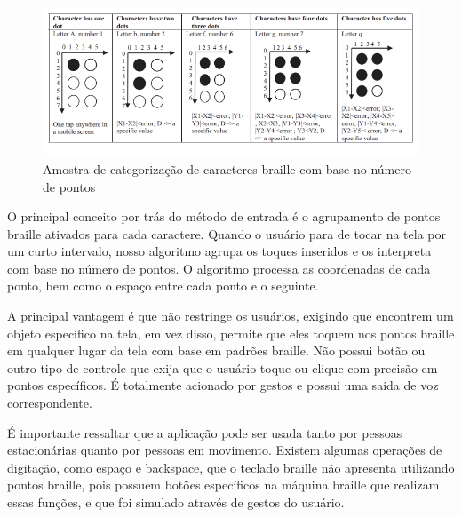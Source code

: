 \begin{figure}[h]
    \centering
    \includegraphics{ch02/assets/categorization-of-braille.png}
    \decoRule
    \caption[Categorização de coordenadas do SingleTapBraille]{Amostra de categorização de caracteres braille com base no número de pontos \parencite{REF07}}
    \label{fig:ch02-categorization-of-braille}
\end{figure}

O principal conceito por trás do método de entrada é o agrupamento de pontos braille ativados para cada caractere. Quando o usuário para de tocar na tela por um curto intervalo, nosso algoritmo agrupa os toques inseridos e os interpreta com base no número de pontos. O algoritmo processa as coordenadas de cada ponto, bem como o espaço entre cada ponto e o seguinte.

A principal vantagem é que não restringe os usuários, exigindo que encontrem um objeto específico na tela, em vez disso, permite que eles toquem nos pontos braille em qualquer lugar da tela com base em padrões braille. Não possui botão ou outro tipo de controle que exija que o usuário toque ou clique com precisão em pontos específicos. É totalmente acionado por gestos e possui uma saída de voz correspondente. 

É importante ressaltar que a aplicação pode ser usada tanto por pessoas estacionárias quanto por pessoas em movimento. Existem algumas operações de digitação, como espaço e backspace, que o teclado braille não apresenta utilizando pontos braille, pois possuem botões específicos na máquina braille que realizam essas funções, e que foi simulado através de gestos do usuário.

